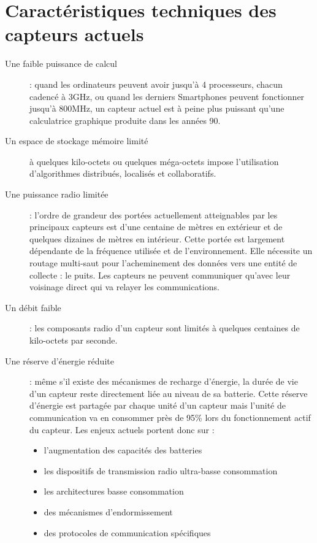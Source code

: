 \section{Caractéristiques techniques des capteurs actuels}

\begin{description}
\item[Une faible puissance de calcul] : quand les ordinateurs peuvent avoir jusqu'à 4 processeurs, chacun cadencé à 3GHz, ou quand les derniers Smartphones peuvent fonctionner jusqu’à 800MHz, un capteur actuel est à peine plus puissant qu’une calculatrice graphique produite dans les années 90.

\item[Un espace de stockage mémoire limité] à quelques kilo-octets ou quelques méga-octets impose l'utilisation d'algorithmes distribués, localisés et collaboratifs.

\item[Une puissance radio limitée] : l’ordre de grandeur des portées actuellement atteignables par les principaux capteurs est d’une centaine de mètres en extérieur et de quelques dizaines de mètres en intérieur. Cette portée est largement dépendante de la fréquence utilisée et de l’environnement. Elle nécessite un routage multi-saut pour l’acheminement des données vers une entité de collecte : le puits. Les capteurs ne peuvent communiquer qu’avec leur voisinage direct qui va relayer les communications.

\item[Un débit faible] : les composants radio d’un capteur sont limités à quelques centaines de kilo-octets par seconde.

\item[Une réserve d’énergie réduite] : même s’il existe des mécanismes de recharge d’énergie, la durée de vie d’un capteur reste directement liée au niveau de sa batterie. Cette réserve d’énergie est partagée par chaque unité d’un capteur mais l’unité de communication va en consommer près de 95\% lors du fonctionnement actif du capteur. Les enjeux actuels portent donc sur :
	\begin{itemize}
	\item l’augmentation des capacités des batteries
	\item les dispositifs de transmission radio ultra-basse consommation
	\item les architectures basse consommation
	\item des mécanismes d’endormissement
	\item des protocoles de communication spécifiques
	\end{itemize}
\end{description}



